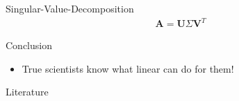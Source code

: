 \documentclass[notes]{beamer}
\begin{document}
  \begin{frame}{Singular-Value-Decomposition}
    \begin{align}
      \mathbf{A} = \mathbf{U}\Sigma \mathbf{V}^T
    \end{align}
  \end{frame}

  \begin{frame}{Conclusion}
    \begin{itemize}
      \item True scientists know what linear can do for them!
    \end{itemize}
  \end{frame}

  \begin{frame}{Literature}
    \printbibliography
  \end{frame}
\end{document}
